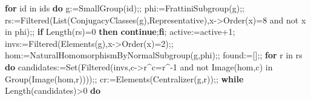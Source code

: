 \documentclass[
  10pt,
  letterpaper,
]{article}
\newenvironment{Shaded}{}{}
\newcommand{\BuiltInTok}[1]{\textcolor[rgb]{0.00,0.50,0.00}{#1}}
\newcommand{\ConstantTok}[1]{\textcolor[rgb]{0.53,0.00,0.00}{#1}}
\newcommand{\ControlFlowTok}[1]{\textcolor[rgb]{0.00,0.44,0.13}{\textbf{#1}}}
\newcommand{\ExtensionTok}[1]{#1}
\newcommand{\FloatTok}[1]{\textcolor[rgb]{0.25,0.63,0.44}{#1}}
\newcommand{\NormalTok}[1]{#1}
\newcommand{\OperatorTok}[1]{\textcolor[rgb]{0.40,0.40,0.40}{#1}}
\newcommand{\VariableTok}[1]{\textcolor[rgb]{0.10,0.09,0.49}{#1}}
\begin{document}
\begin{Shaded}
\begin{Highlighting}[]
\ControlFlowTok{for} \VariableTok{id} \ExtensionTok{in} \VariableTok{ids} \ControlFlowTok{do}
 \VariableTok{g}\OperatorTok{:=}\BuiltInTok{SmallGroup}\NormalTok{(}\VariableTok{id}\NormalTok{)}\OperatorTok{;;}
 \VariableTok{phi}\OperatorTok{:=}\BuiltInTok{FrattiniSubgroup}\NormalTok{(}\VariableTok{g}\NormalTok{)}\OperatorTok{;;}
 \VariableTok{rs}\OperatorTok{:=}\BuiltInTok{Filtered}\NormalTok{(}\BuiltInTok{List}\NormalTok{(}\BuiltInTok{ConjugacyClasses}\NormalTok{(}\VariableTok{g}\NormalTok{)}\OperatorTok{,}\BuiltInTok{Representative}\NormalTok{)}\OperatorTok{,}\VariableTok{x}\OperatorTok{{-}\textgreater{}}\BuiltInTok{Order}\NormalTok{(}\VariableTok{x}\NormalTok{)}\OperatorTok{=}\FloatTok{8} \ConstantTok{and} \ConstantTok{not} \VariableTok{x} \ExtensionTok{in} \VariableTok{phi}\NormalTok{)}\OperatorTok{;;}
 \ControlFlowTok{if} \BuiltInTok{Length}\NormalTok{(}\VariableTok{rs}\NormalTok{)}\OperatorTok{=}\FloatTok{0} \ControlFlowTok{then} \ControlFlowTok{continue}\OperatorTok{;}\ControlFlowTok{fi}\OperatorTok{;}
 \VariableTok{active}\OperatorTok{:=}\VariableTok{active}\OperatorTok{+}\FloatTok{1}\OperatorTok{;}
 \VariableTok{invs}\OperatorTok{:=}\BuiltInTok{Filtered}\NormalTok{(}\BuiltInTok{Elements}\NormalTok{(}\VariableTok{g}\NormalTok{)}\OperatorTok{,}\VariableTok{x}\OperatorTok{{-}\textgreater{}}\BuiltInTok{Order}\NormalTok{(}\VariableTok{x}\NormalTok{)}\OperatorTok{=}\FloatTok{2}\NormalTok{)}\OperatorTok{;;}
 \VariableTok{hom}\OperatorTok{:=}\BuiltInTok{NaturalHomomorphismByNormalSubgroup}\NormalTok{(}\VariableTok{g}\OperatorTok{,}\VariableTok{phi}\NormalTok{)}\OperatorTok{;;}
 \VariableTok{found}\OperatorTok{:=}\NormalTok{[]}\OperatorTok{;;}
 \ControlFlowTok{for} \VariableTok{r} \ExtensionTok{in} \VariableTok{rs} \ControlFlowTok{do}
  \VariableTok{candidates}\OperatorTok{:=}\BuiltInTok{Set}\NormalTok{(}\BuiltInTok{Filtered}\NormalTok{(}\VariableTok{invs}\OperatorTok{,}\VariableTok{c}\OperatorTok{{-}\textgreater{}}\VariableTok{r}\OperatorTok{\^{}}\VariableTok{c}\OperatorTok{=}\VariableTok{r}\OperatorTok{\^{}{-}}\FloatTok{1} \ConstantTok{and} \ConstantTok{not} \BuiltInTok{Image}\NormalTok{(}\VariableTok{hom}\OperatorTok{,}\VariableTok{c}\NormalTok{) }\ExtensionTok{in} \BuiltInTok{Group}\NormalTok{(}\BuiltInTok{Image}\NormalTok{(}\VariableTok{hom}\OperatorTok{,}\VariableTok{r}\NormalTok{))))}\OperatorTok{;;}
  \VariableTok{cr}\OperatorTok{:=}\BuiltInTok{Elements}\NormalTok{(}\BuiltInTok{Centralizer}\NormalTok{(}\VariableTok{g}\OperatorTok{,}\VariableTok{r}\NormalTok{))}\OperatorTok{;;}
  \ControlFlowTok{while} \BuiltInTok{Length}\NormalTok{(}\VariableTok{candidates}\NormalTok{)}\OperatorTok{\textgreater{}}\FloatTok{0} \ControlFlowTok{do}

\end{Highlighting}
\end{Shaded}
\end{document}

